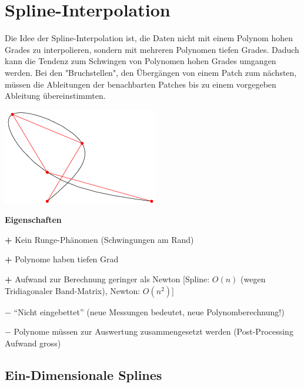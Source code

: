 \section{Spline-Interpolation}

\begin{minipage}[c]{14.5cm}
Die Idee der Spline-Interpolation ist, die Daten nicht mit einem Polynom hohen Grades zu interpolieren, sondern mit mehreren Polynomen tiefen Grades. Daduch kann die Tendenz  zum Schwingen von Polynomen hohen Grades umgangen werden. Bei den "Bruchstellen", den Übergängen von einem Patch zum nächsten, müssen die Ableitungen der benachbarten Patches bis zu einem vorgegeben Ableitung übereinstimmten.
\end{minipage}
\hfill
\begin{minipage}[c]{4cm}
\includegraphics[width=\textwidth]{bilder/kubikSpline}
\end{minipage}

\textbf{Eigenschaften}
\begin{liste}
  \item[\textbf{+}] Kein Runge-Phänomen (Schwingungen am Rand)
  \item[\textbf{+}] Polynome haben tiefen Grad
  \item[\textbf{+}] Aufwand zur Berechnung geringer als Newton [Spline: $O(n)$ (wegen Tridiagonaler Band-Matrix), Newton: $O(n^2)$]  
  \item[$\mathbf{-}$] "`Nicht eingebettet"' (neue Messungen bedeutet, neue Polynomberechnung!)
  \item[$\mathbf{-}$] Polynome müssen zur Auswertung zusammengesetzt werden (Post-Processing Aufwand gross)
\end{liste}


\subsection{Ein-Dimensionale Splines}
